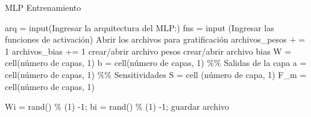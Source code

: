 \documentclass{article}
\begin{document}
 \begin{algorithm}
\caption{MLP Entrenamiento}\label{euclid}
\begin{algorithmic}[1]
\EndProcedure
\State
{}
\EndProcedure
\State
{}
\EndProcedure
\State
\State arq = input(Ingresar la arquitectura del MLP:)
\State fns = input (Ingresar las funciones de activaci\'on)
\State Abrir los archivos para gratificaci\'on
\State
{} 
	\State archivos\_pesos $+=$ 1
	\State archivos\_bias += 1
	\State crear/abrir archivo pesos
	\State crear/abrir archivo bias
\EndFor
{}
\EndProcedure
\State
{}
\EndProcedure
\State
{}
\EndProcedure
\State
{}
\EndProcedure
\State
\State W = cell(n\'umero de capas, 1)
\State b = cell(n\'umero de capas, 1)
\State \%\% Salidas de la capa
\State a = cell(n\'umero de capas, 1)
\State \%\% Sensitividades
\State S = cell (n\'umero de capa, 1)
\State F\_m = cell(n\'umero de capas, 1)

    \State W{i} = rand() \% (1) -1;
    \State b{i} = rand() \% (1) -1;
    \State guardar archivo
\EndFor
\end{algorithmic}
\end{algorithm}
\end{document}
